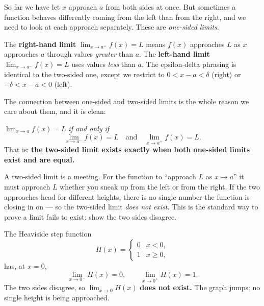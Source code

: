 So far we have let $x$ approach $a$ from both sides at once. But sometimes a
function behaves differently coming from the left than from the right, and we
need to look at each approach separately. These are \emph{one-sided limits}.

\begin{definition}
\label{ch07:def-onesided}
The \textbf{right-hand limit} $\displaystyle\lim_{x\to a^{+}} f(x) = L$ means
$f(x)$ approaches $L$ as $x$ approaches $a$ through values \emph{greater} than
$a$. The \textbf{left-hand limit} $\displaystyle\lim_{x\to a^{-}} f(x) = L$
uses values \emph{less} than $a$. The epsilon-delta phrasing is identical to
the two-sided one, except we restrict to $0 < x - a < \delta$ (right) or
$-\delta < x - a < 0$ (left).
\end{definition}

The connection between one-sided and two-sided limits is the whole reason we
care about them, and it is clean:

\begin{theorem}[Two-sided $=$ both one-sided agreeing]
\label{ch07:thm-onesided}
$\displaystyle\lim_{x\to a} f(x) = L$ \emph{if and only if}
\[
  \lim_{x\to a^{-}} f(x) = L \quad\text{and}\quad \lim_{x\to a^{+}} f(x) = L.
\]
That is: \textbf{the two-sided limit exists exactly when both one-sided limits
exist and are equal.}
\end{theorem}

\begin{intuitionbox}
A two-sided limit is a meeting. For the function to ``approach $L$ as $x\to a$''
it must approach $L$ whether you sneak up from the left or from the right. If
the two approaches head for different heights, there is no single number the
function is closing in on --- so the two-sided limit \emph{does not exist}.
This is the standard way to prove a limit fails to exist: show the two sides
disagree.
\end{intuitionbox}

\begin{example}
\label{ch07:ex-jump}
The Heaviside step function
\[
  H(x) = \begin{cases} 0 & x < 0,\\ 1 & x \ge 0,\end{cases}
\]
has, at $x=0$,
\[
  \lim_{x\to 0^{-}} H(x) = 0,
  \qquad
  \lim_{x\to 0^{+}} H(x) = 1.
\]
The two sides disagree, so $\displaystyle\lim_{x\to 0} H(x)$ \textbf{does not
exist.} The graph jumps; no single height is being approached.
\end{example}

